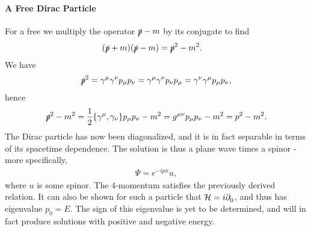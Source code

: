 \paragraph{A Free Dirac Particle}
For a free we multiply the operator $\slashed{p} - m$ by its conjugate to find
\begin{align*}
	(\slashed{p} + m)(\slashed{p} - m) &= \slashed{p}^{2} - m^{2}.
\end{align*}
We have
\begin{align*}
	\slashed{p}^{2} = \gamma^{\mu}\gamma^{\nu}p_{\mu}p_{\nu} = \gamma^{\mu}\gamma^{\nu}p_{\nu}p_{\mu} = \gamma^{\nu}\gamma^{\mu}p_{\mu}p_{\nu},
\end{align*}
hence
\begin{align*}
	\fsl{p}^{2} - m^{2} = \frac{1}{2}\acomm{\gamma^{\mu}}{\gamma_{\nu}}p_{\mu}p_{\nu} - m^{2} = g^{\mu\nu}p_{\mu}p_{\nu} - m^{2} = p^{2} - m^{2}.
\end{align*}
The Dirac particle has now been diagonalized, and it is in fact separable in terms of its spacetime dependence. The solution is thus a plane wave times a spinor - more specifically,
\begin{align*}
	\Psi = e^{-ipx}u,
\end{align*}
where $u$ is some spinor. The 4-momentum satisfies the previously derived relation. It can also be shown for such a particle that $\mathcal{H} = i\partial^{}_{0}{}$, and thus has eigenvalue $p_{0} = E$. The sign of this eigenvalue is yet to be determined, and will in fact produce solutions with positive and negative energy.

